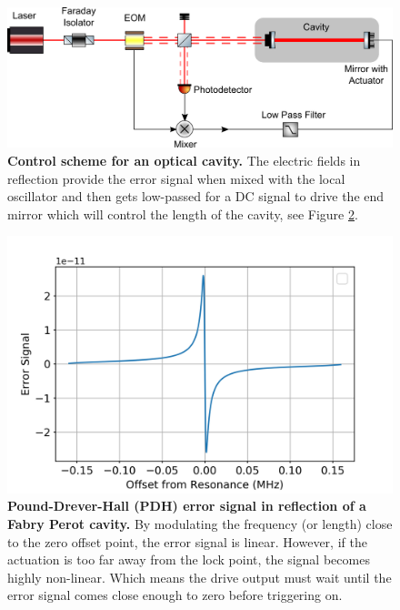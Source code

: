 		\begin{figure}[h]
		\centering
		\includegraphics[width=.6 \textwidth]{../Figures/FP_Control.png}
		\caption[Control scheme for an optical cavity.]{\textbf{Control scheme for an optical cavity.} The electric fields in reflection provide the error signal when mixed with the local oscillator and then gets low-passed for a DC signal to drive the end mirror which will control the length of the cavity, see Figure \ref{fig:FP_err}.}
		\label{fig:FPControl}
		\end{figure}
	
		\begin{figure}[h]
		\centering
		\includegraphics[width=.6 \textwidth]{../Figures/PDH_Err.png}
		\caption[Error signal in reflection]{\textbf{Pound-Drever-Hall (PDH) error signal in reflection of a Fabry Perot cavity.}  By modulating the frequency (or length) close to the zero offset point, the error signal is linear.  However, if the actuation is too far away from the lock point, the signal becomes highly non-linear.  Which means the drive output must wait until the error signal comes close enough to zero before triggering on. }
		\label{fig:FP_err}
		\end{figure}
		
